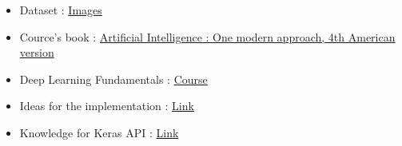 \begin{itemize}
  \item Dataset :  \href{https://www.kaggle.com/datasets/paultimothymooney/breast-histopathology-images/data}{Images}
  \item Cource's book :
  \href{https://www.google.com/search?q=τεχνητή+νοημοσύνη+μια+σύγχρονη+προσέγγιση+4h+ekdosh&client=opera&hs=n79&sca_esv=00980f6df5fed681&prmd=visnbz&sxsrf=ACQVn0_dZwrzQ3-RWJTv6ZM17dYHbBfDiw:1713282338477&source=lnms&sa=X&ved=2ahUKEwiH-byJiseFAxWHhP0HHbRJC24Q0pQJegQIAxAC&biw=1482&bih=706&dpr=1.25}{Artificial Intelligence : One modern approach, 4th American version}
  \item Deep Learning Fundamentals : \href{https://deeplizard.com/learn/playlist/PLZbbT5o_s2xq7LwI2y8_QtvuXZedL6tQU}{Course}
  \item Ideas for the implementation : \href{https://wisdomml.in/breast-cancer-prediction-using-machine-learning/}{Link}
  \item Knowledge for Keras API : \href{https://www.tensorflow.org/guide/keras}{Link}
\end{itemize}
